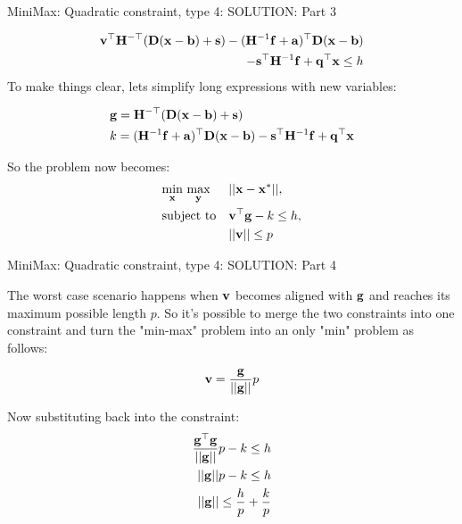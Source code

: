 \documentclass{beamer}
\begin{document}
\begin{frame}{MiniMax: Quadratic constraint, type 4: SOLUTION: Part 3}
\begin{flushleft}

%
\begin{equation}
\begin{aligned}
\mathbf{v}^\top\mathbf{H}^{-\top}(\mathbf{D} (\mathbf{x} - \mathbf{b}) + \mathbf{s}) - (\mathbf{H}^{-1}\mathbf{f} + \mathbf{a})^\top\mathbf{D} (\mathbf{x} - \mathbf{b})\\
-\mathbf{s}^\top\mathbf{H}^{-1}\mathbf{f}  + \mathbf{q}^\top \mathbf{x} \leq h
\end{aligned}
\end{equation}
 To make things clear, lets simplify long expressions with new variables:

\begin{align}
& \mathbf{g} = \mathbf{H}^{-\top}(\mathbf{D} (\mathbf{x} - \mathbf{b}) + \mathbf{s}) \\
& k = (\mathbf{H}^{-1}\mathbf{f} + \mathbf{a})^\top\mathbf{D} (\mathbf{x} - \mathbf{b})
-\mathbf{s}^\top\mathbf{H}^{-1}\mathbf{f}  + \mathbf{q}^\top \mathbf{x}
\end{align}

So the problem now becomes:
\begin{equation}
\begin{aligned}
& \underset{\mathbf{x}}{\text{min}} \ \underset{\mathbf{y}}{\text{max}}
& & ||\mathbf{x} - \mathbf{x}^*||, \\
& \text{subject to}
& & \mathbf{v}^\top\mathbf{g} - k \leq h, \\
& & & ||\mathbf{v}|| \leq p
\end{aligned}
\end{equation}

\end{flushleft}
\end{frame}



\begin{frame}{MiniMax: Quadratic constraint, type 4: SOLUTION: Part 4}
\begin{flushleft}

%
The worst case scenario happens when $\mathbf{v}$ becomes aligned with $\mathbf{g}$ and reaches its maximum possible length $p$. So it's possible to merge the two constraints into one constraint and turn the "min-max" problem into an only "min" problem as follows:

\begin{align}
\mathbf{v} = \frac{\mathbf{g}}{||\mathbf{g}||}p
\end{align}

Now substituting back into the constraint:
\begin{align}
\frac{\mathbf{g}^\top\mathbf{g}}{||\mathbf{g}||}p - k \leq h \\
||\mathbf{g}||p - k \leq h\\
||\mathbf{g}||\leq \frac{h}{p} + \frac{k}{p}
\end{align}

\end{flushleft}
\end{frame}
\end{document}
